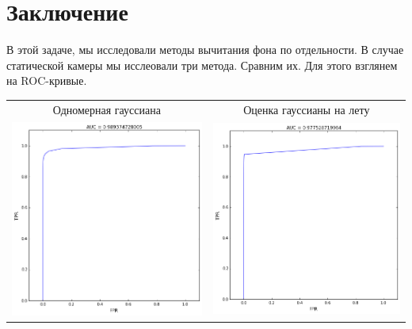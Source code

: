 \documentclass[12pt, a4paper]{article}
\begin{document}
	\section{Заключение}
		В этой задаче, мы исследовали методы вычитания фона по отдельности. В случае статической камеры мы исслеовали три метода. Сравним их. Для этого взглянем на ROC-кривые.
		\begin{center}
			\begin{tabular}{c c}
				\hline
				Одномерная гауссиана & Оценка гауссианы на лету \\


				\includegraphics[width=8cm]{1par_auc.png} &
				\includegraphics[width=8cm]{2par_auc.png} \\
				

\end{tabular}
\end{center}
\end{document}
